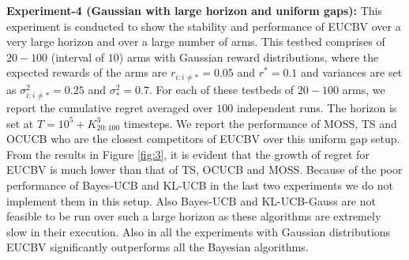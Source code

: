 \textbf{Experiment-4 (Gaussian with large horizon and uniform gaps):} This experiment is conducted to show the stability and performance of EUCBV over a very large horizon and over a large number of arms. This testbed comprises of $20-100$ (interval of $10$) arms with Gaussian reward distributions, where the expected rewards of the arms are $r_{i:i\neq {*}}=0.05$ and $r^{*}=0.1$ and variances are set as $\sigma_{i:i\neq *}^{2}=0.25$ and $\sigma_{*}^{2}=0.7$. For each of these testbeds of $20-100$ arms, we report the cumulative regret averaged over $100$ independent runs. The horizon is set at $T=10^{5} + K_{20:100}^{3}$ timesteps. We report the performance of MOSS, TS and OCUCB who are the closest competitors of EUCBV over this uniform gap setup. From the results in Figure \ref{fig:3}, it is evident that the growth of regret for EUCBV  is much lower than that of TS, OCUCB and MOSS. Because of the poor performance of Bayes-UCB and KL-UCB in the last two experiments we do not implement them in this setup.  Also Bayes-UCB and KL-UCB-Gauss are not feasible to be run over such a large horizon as these algorithms are extremely slow in their execution. Also in all the experiments with Gaussian distributions EUCBV significantly outperforms all the Bayesian algorithms.


